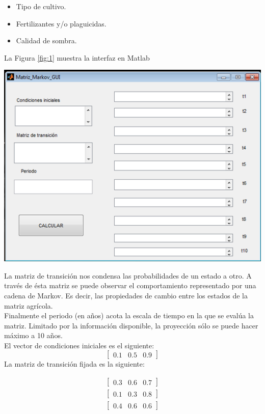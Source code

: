 \begin{itemize}
\item Tipo de cultivo.
\item Fertilizantes y/o plaguicidas.
\item Calidad de sombra.
\end{itemize}

La Figura \ref{fig:1} muestra la interfaz en Matlab

\begin{center}
\includegraphics[scale=0.45]{imagenes/4-agricola/1}
\label{fig:1}
\end{center}

La matriz de transición nos condensa las probabilidades de un estado a otro. A través de ésta matriz se puede observar el comportamiento representado por una cadena de Markov. Es decir, las propiedades de cambio entre los estados de la matriz agrícola.\\

Finalmente el periodo (en años) acota la escala de tiempo en la que se evalúa la matriz. Limitado por la información disponible, la proyección sólo se puede hacer máximo a 10 años.\\

El vector de condiciones iniciales es el siguiente:
$$\left[\begin{array}{ccc}
0{.}1&0{.}5&0{.}9
\end{array}\right]$$
La matriz de transición fijada es la siguiente:

\begin{align*}
\left[\begin{array}{ccc}
0{.}3&0{.}6&0{.}7
\end{array}\right]\\
\left[\begin{array}{ccc}
0{.}1&0{.}3&0{.}8
\end{array}\right]\\
\left[\begin{array}{ccc}
0{.}4&0{.}6&0{.}6
\end{array}\right]
\end{align*}


